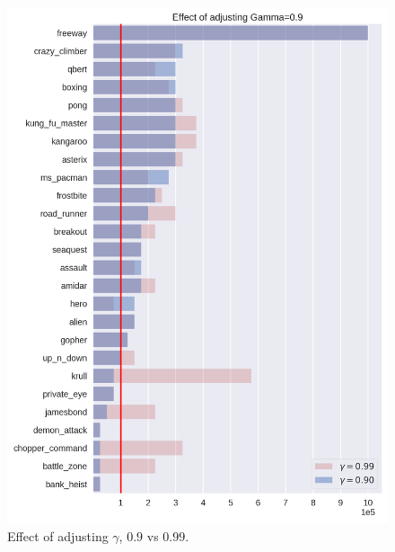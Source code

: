 
\begin{figure}
\centering
\includegraphics[width=0.9\columnwidth]{figures/eval_sd_g90.png}
\caption{Effect of adjusting $\gamma$, $0.9$ vs $0.99$.} 
\label{fig:adj_gamma}
\end{figure}


